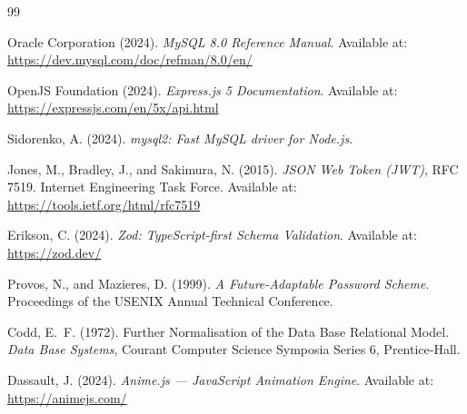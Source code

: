 \documentclass[12pt,a4paper]{article}
\begin{document}
\newpage
{}
\begin{thebibliography}{99}

Oracle Corporation (2024).
\textit{MySQL 8.0 Reference Manual}.
Available at: \url{https://dev.mysql.com/doc/refman/8.0/en/}

OpenJS Foundation (2024).
\textit{Express.js 5 Documentation}.
Available at: \url{https://expressjs.com/en/5x/api.html}

Sidorenko, A. (2024).
\textit{mysql2: Fast MySQL driver for Node.js}.

Jones, M., Bradley, J., and Sakimura, N. (2015).
\textit{JSON Web Token (JWT)}, RFC 7519.
Internet Engineering Task Force.
Available at: \url{https://tools.ietf.org/html/rfc7519}

Erikson, C. (2024).
\textit{Zod: TypeScript-first Schema Validation}.
Available at: \url{https://zod.dev/}

Provos, N., and Mazieres, D. (1999).
\textit{A Future-Adaptable Password Scheme}.
Proceedings of the USENIX Annual Technical Conference.

Codd, E.~F. (1972).
Further Normalisation of the Data Base Relational Model.
\textit{Data Base Systems}, Courant Computer Science Symposia Series 6,
Prentice-Hall.

Dassault, J. (2024).
\textit{Anime.js --- JavaScript Animation Engine}.
Available at: \url{https://animejs.com/}

\end{thebibliography}
\end{document}
